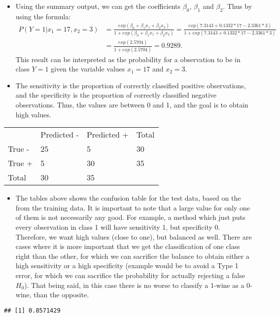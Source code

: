\documentclass[]{article}
\providecommand{\tightlist}{%
  \setlength{\itemsep}{0pt}\setlength{\parskip}{0pt}}
\begin{document}
\begin{itemize}
\item
  Using the summary output, we can get the coefficients \(\beta_0\),
  \(\beta_1\) and \(\beta_2\). Thus by using the formula: \[
  \begin{split}
  P(Y=1|x_1 = 17, x_2=3) &= \frac{exp(\beta_0 + \beta_1 x_1 + \beta_2 x_2)}{1+exp(\beta_0 + \beta_1 x_1 + \beta_2 x_2)} = \frac{exp( 7.3143 + 0.1332*17 - 2.3361*3)}{1+exp( 7.3143 + 0.1332*17 - 2.3361*3)} \\ 
  & = \frac{exp(2.5704)}{1+exp(2.5704)}=0.9289.
  \end{split}
  \] This result can be interpreted as the probability for a observation
  to be in class \(Y=1\) given the variable values \(x_1 = 17\) and
  \(x_2=3\).
\item
  The sensitivity is the proportion of correctly classified positive
  observations, and the specificity is the proportion of correctly
  classified negative observations. Thus, the values are between 0 and
  1, and the goal is to obtain high values.
\end{itemize}

\begin{longtable}[]{@{}llll@{}}
\toprule
& Predicted - & Predicted + & Total\tabularnewline
True - & 25 & 5 & 30\tabularnewline
True + & 5 & 30 & 35\tabularnewline
Total & 30 & 35 &\tabularnewline
\bottomrule
\end{longtable}

\begin{itemize}
\tightlist
\item
  The tables above shows the confusion table for the test data, based on
  the from the training data. It is important to note that a large value
  for only one of them is not necessarily any good. For example, a
  method which just puts every observation in class 1 will have
  sensitivity 1, but specificity 0. Therefore, we want high values
  (close to one), but balanced as well. There are cases where it is more
  important that we get the classification of one class right than the
  other, for which we can sacrifice the balance to obtain either a high
  sensitivity or a high specificity (example would be to avoid a Type 1
  error, for which we can sacrifice the probability for actually
  rejecting a false \(H_0\)). That being said, in this case there is no
  worse to classify a 1-wine as a 0-wine, than the opposite.
\end{itemize}

\begin{verbatim}
## [1] 0.8571429
\end{verbatim}
\end{document}
